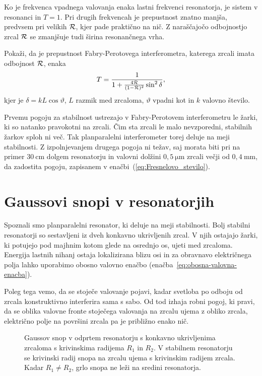 Ko je frekvenca vpadnega valovanja enaka lastni frekvenci
resonatorja, je sistem v resonanci in $T=1$. Pri drugih frekvencah je prepustnost znatno manjša, predvsem
pri velikih $\cal{R}$, kjer pade praktično na nič. Z naraščajočo odbojnostjo zrcal ${\cal R}$ 
se zmanjšuje tudi širina resonančnega vrha.
\begin{definition}
\label{naloga:FP}
Pokaži, da je prepustnost Fabry-Perotovega interferometra, katerega zrcali imata odbojnost $\cal{R}$, enaka 
\begin{equation}
T = \frac{1}{1+\frac{4\cal{R}}{(1-{\cal R})^2}\sin^2 \delta},
\label{eq:FP}
\end{equation}
kjer je $\delta = kL\cos{\vartheta}$, $L$ razmik med zrcaloma, $\vartheta$ vpadni kot in
$k$ valovno število.
\end{definition}

Prvemu pogoju za stabilnost ustrezajo v Fabry-Perotovem interferometru
le žarki, ki so natanko pravokotni na zrcali. Čim sta zrcali le
malo nevzporedni, stabilnih žarkov sploh ni več. Tak 
planparalelni interferometer torej deluje 
na meji stabilnosti. Z izpolnjevanjem drugega
pogoja ni težav, saj morata biti pri na primer $30~\si{\centi\metre}$ dolgem resonatorju in 
valovni dolžini $0,5~\si{\micro\metre}$ zrcali večji od $0,4~\si{\milli\metre}$, da zadostita pogoju, 
zapisanem v enačbi~(\ref{eq:Fresnelovo_stevilo}).

\section{Gaussovi snopi v resonatorjih}
Spoznali smo planparalelni resonator, ki deluje na meji stabilnosti. 
Bolj stabilni resonatorji so sestavljeni iz dveh konkavno ukrivljenih
zrcal. V njih ostajajo žarki, ki potujejo pod majhnim kotom glede na osrednjo os, ujeti
med zrcaloma. Energija lastnih nihanj ostaja lokalizirana blizu osi in za obravnavo
električnega polja lahko uporabimo obosno valovno 
enačbo (enačba~\ref{eq:obosna-valovna-enacba}). 

Poleg tega vemo, da se stoječe valovanje pojavi, kadar
svetloba po odboju od zrcala konstruktivno interferira sama s sabo.
Od tod izhaja robni pogoj, ki pravi, da se oblika valovne fronte stoječega valovanja na 
zrcalu ujema z obliko zrcala, električno polje na površini zrcala
pa je približno enako nič.

\begin{figure}[h]
\centering
\def\svgwidth{110truemm} 

\caption{Gaussov snop v odprtem resonatorju s konkavno ukrivljenima zrcaloma
s krivinskima radijema $R_1$ in $R_2$. V stabilnem resonatorju se krivinski 
radij snopa na zrcalu ujema s krivinskim radijem zrcala. Kadar $R_1 \neq R_2$, 
grlo snopa ne leži na sredini resonatorja.}
\label{fig:Gaussov-snop-v-resonatorju}
\end{figure}

